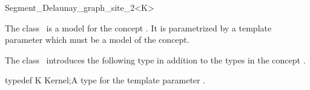 



\begin{ccRefClass}{Segment_Delaunay_graph_site_2<K>}


\ccDefinition
  
The class \ccRefName\ is a model for the concept
. It is parametrized by a template
parameter  which must be a model of the  concept.


\ccIsModel
{}

\ccTypes

The class \ccRefName\ introduces the following type in addition to the
types in the concept .

\ccTypedef
{typedef K Kernel;}{A type for the template parameter .}




\end{ccRefClass}
